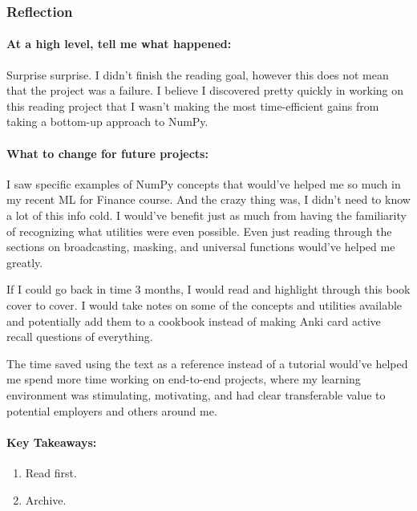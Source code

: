 \subsubsection*{Reflection}

\paragraph*{At a high level, tell me what happened:}

Surprise surprise. I didn't finish the reading goal, however this does not mean that the project was a failure. I believe I discovered pretty quickly in working on this reading project that I wasn't making the most time-efficient gains from taking a bottom-up approach to NumPy.

\paragraph*{What to change for future projects:}

I saw specific examples of NumPy concepts that would've helped me so much in my recent ML for Finance course. And the crazy thing was, I didn't need to know a lot of this info cold. I would've benefit just as much from having the familiarity of recognizing what utilities were even possible. Even just reading through the sections on broadcasting, masking, and universal functions would've helped me greatly.

If I could go back in time 3 months, I would read and highlight through this book cover to cover. I would take notes on some of the concepts and utilities available and potentially add them to a cookbook instead of making Anki card active recall questions of everything.

The time saved using the text as a reference instead of a tutorial would've helped me spend more time working on end-to-end projects, where my learning environment was stimulating, motivating, and had clear transferable value to potential employers and others around me.

\paragraph*{Key Takeaways:}
\begin{enumerate}
\item Read first.
\item Archive.

\end{enumerate}


